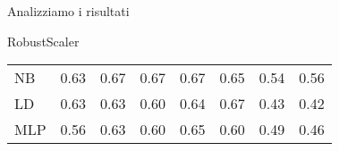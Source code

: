 \documentclass{beamer}
\begin{document}
\begin{frame}{Analizziamo i risultati}
\begin{block}{RobustScaler}
\begin{center}
\begin{adjustbox}{max width=\textwidth}
\begin{tabular}{lrrrrrrr}
					NB  &  0.63 &                  0.67 &                   0.67 &                   0.67 &                   0.65 &                    0.54 &                    0.56 \\
					LD  &  0.63 &                  0.63 &                   0.60 &                   0.64 &                   0.67 &                    0.43 &                    0.42 \\
					MLP &  0.56 &                  0.63 &                   0.60 &                   0.65 &                   0.60 &                    0.49 &                    0.46 \\
					\bottomrule
				\end{tabular}
			\end{adjustbox}
		\end{center}
	\end{block}
\end{frame}
\end{document}
